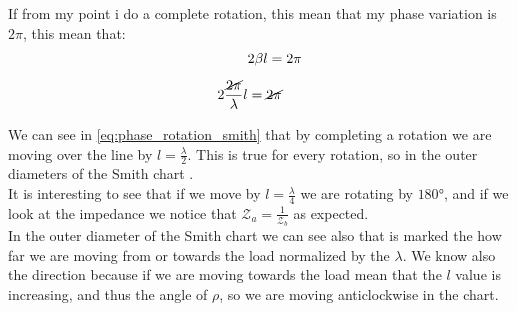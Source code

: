 If from my point i do a complete rotation, this mean that my phase variation is $2\pi$, this mean that:
\begin{align}
    \begin{split}
        &2\beta l=2\pi\\[5pt]
        2 \frac{\cancel{2\pi}}{\lambda}l&=\cancel{2\pi}\\[5pt]
    \end{split}\label{eq:phase_rotation_smith}
\end{align}
We can see in \cref{eq:phase_rotation_smith} that by completing a rotation we are moving over the line by $l=\frac{\lambda}{2}$. This is true for every rotation, so in the outer diameters of the Smith chart .\\
It is interesting to see that if we move by $l=\frac{\lambda}{4}$ we are rotating by $180\si{\degree}$, and if we look at the impedance we notice that $\mathcal{Z}_a=\frac{1}{\mathcal{Z}_b}$ as expected.\\
In the outer diameter of the Smith chart we can see also that is marked the how far we are moving from or towards the load normalized by the $\lambda$. We know also the direction because if we are moving towards the load mean that the $l$ value is increasing, and thus the angle of $\rho$, so we are moving anticlockwise in the chart.

